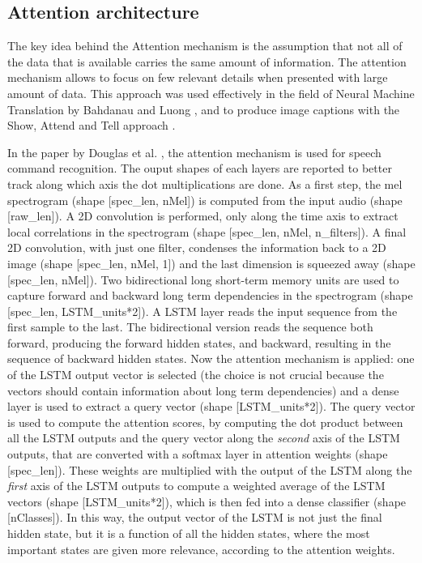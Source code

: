 \subsection{Attention architecture}

The key idea behind the Attention mechanism is the assumption that not all of
the data that is available carries the same amount of information.
The attention mechanism allows to focus on few relevant details when presented
with large amount of data.
This approach was used effectively in the field of Neural Machine Translation
by Bahdanau \cite{bahdanau2016neural} and Luong \cite{luong2015effective}, and
to produce image captions with the Show, Attend and Tell approach
\cite{xu2016show}.

In the paper by Douglas et al. \cite{2018arXiv180808929C}, the attention
mechanism is used for speech command recognition.
The ouput shapes of each layers are reported to better track along which axis
the dot multiplications are done.
As a first step, the mel spectrogram
(shape [spec\_len, nMel])
is computed from the input audio
(shape [raw\_len]).
A 2D convolution is performed, only along the time axis to extract local
correlations in the spectrogram
(shape [spec\_len, nMel, n\_filters]).
A final 2D convolution, with just one filter, condenses the information back to
a 2D image
(shape [spec\_len, nMel, 1])
and the last dimension is squeezed away
(shape [spec\_len, nMel]).
Two bidirectional \cite{Schuster1997BidirectionalRN} long short-term memory
\cite{lstm} units are used to capture forward and backward long term
dependencies in the spectrogram
(shape [spec\_len, LSTM\_units*2]).
A LSTM layer reads the input sequence from the first sample to the last. The
bidirectional version reads the sequence both forward, producing the forward
hidden states, and backward, resulting in the sequence of backward hidden
states.
Now the attention mechanism is applied: one of the LSTM output vector is
selected (the choice is not crucial because the vectors should contain
information about long term dependencies) and a dense layer is used to extract
a query vector
(shape [LSTM\_units*2]).
The query vector is used to compute the attention scores, by computing the dot
product between all the LSTM outputs and the query vector along the
\textit{second} axis of the LSTM outputs, that are converted with a softmax
layer in attention weights
(shape [spec\_len]).
These weights are multiplied with the output of the LSTM along the
\textit{first} axis of the LSTM outputs to compute a weighted average of the
LSTM vectors
(shape [LSTM\_units*2]),
which is then fed into a dense classifier
(shape [nClasses]).
In this way, the output vector of the LSTM is not just the final hidden state,
but it is a function of all the hidden states, where the most important states
are given more relevance, according to the attention weights.

